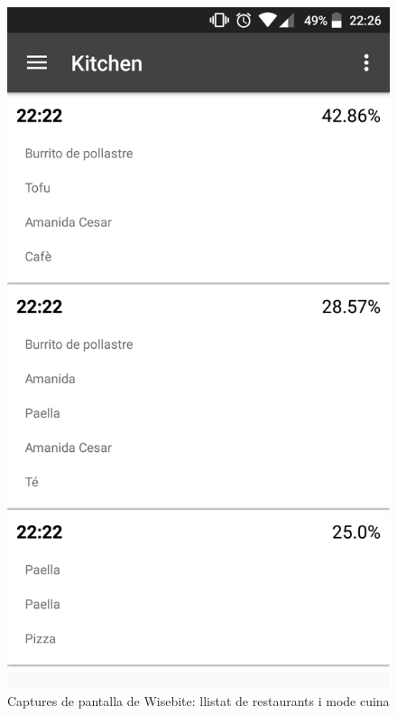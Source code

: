\begin{figure}[!h]
\includegraphics[scale=0.15]{Figures/wisebite_screenshot_2.png}
\caption{Captures de pantalla de Wisebite: llistat de restaurants i mode cuina}
\end{figure}

